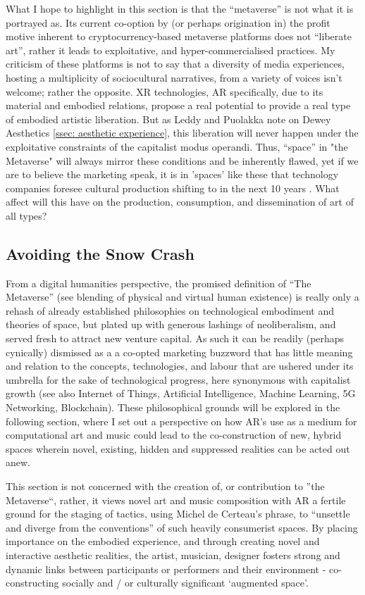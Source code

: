 What I hope to highlight in this section is that the “metaverse” is not what it is portrayed as. Its current co-option by (or perhaps origination in) the profit motive inherent to cryptocurrency-based metaverse platforms does not “liberate art”, rather it leads to exploitative, and hyper-commercialised practices. My criticism of these platforms is not to say that a diversity of media experiences, hosting a multiplicity of sociocultural narratives, from a variety of voices isn’t welcome; rather the opposite. XR technologies, AR specifically, due to its material and embodied relations, propose a real potential to provide a real type of embodied artistic liberation. But as Leddy and Puolakka note on Dewey Aesthetics \autoref{ssec: aesthetic experience}, this liberation will never happen under the exploitative constraints of the capitalist modus operandi. Thus, “space” in "the Metaverse" will always mirror these conditions and be inherently flawed, yet if we are to believe the marketing speak, it is in 'spaces' like these that technology companies foresee cultural production shifting to in the next 10 years \citep[]{fatemi2022}. What affect will this have on the production, consumption, and dissemination of art of all types?

\subsection{Avoiding the Snow Crash}
From a digital humanities perspective, the promised definition of “The Metaverse” (see blending of physical and virtual human existence) is really only a rehash of already established philosophies on technological embodiment and theories of space, but plated up with generous lashings of neoliberalism, and served fresh to attract new venture capital. As such it can be readily (perhaps cynically) dismissed as a a co-opted marketing buzzword that has little meaning and relation to the concepts, technologies, and labour that are ushered under its umbrella for the sake of technological progress, here synonymous with capitalist growth (see also Internet of Things, Artificial Intelligence, Machine Learning, 5G Networking, Blockchain). These philosophical grounds will be explored in the following section, where I set out a perspective on how AR’s use as a medium for computational art and music could lead to the co-construction of new, hybrid spaces wherein novel, existing, hidden and suppressed realities can be acted out anew. 

This section is not concerned with the creation of, or contribution to ”the Metaverse“, rather, it views novel art and music composition with AR a fertile ground for the staging of tactics, using Michel de Certeau’s phrase, to “unsettle and diverge from the conventions” \citeyearpar[p. 36]{decerteau1984} of such heavily consumerist spaces. By placing importance on the embodied experience, and through creating novel and interactive aesthetic realities, the artist, musician, designer fosters strong and dynamic links between participants or performers and their environment - co-constructing socially and / or culturally significant ‘augmented space’.

